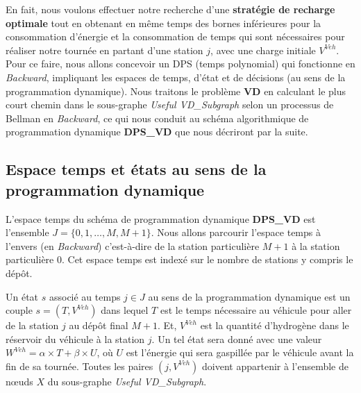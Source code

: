 En fait, nous voulons effectuer notre recherche d'une \textbf{stratégie de recharge optimale} tout en obtenant en même temps des bornes inférieures pour la consommation d'énergie et la consommation de temps qui sont nécessaires pour réaliser notre tournée en partant d'une station $j$, avec une charge initiale $V^{Veh}$. Pour ce faire, nous allons concevoir un DPS (temps polynomial) qui fonctionne en \textit{Backward}, impliquant les espaces de temps, d'état et de décisions (au sens de la programmation dynamique). Nous traitons le problème \textbf{VD} en calculant le plus court chemin dans le sous-graphe \textit{Useful VD\_Subgraph} selon un processus de Bellman en \textit{Backward}, ce qui nous conduit au schéma algorithmique de programmation dynamique \textbf{DPS\_VD} que nous décriront par la suite.
\subsection{Espace temps et états au sens de la programmation dynamique}
L'espace temps du schéma de programmation dynamique \textbf{DPS\_VD} est l'ensemble $J=\{0, 1, \dots, M, M+1\}$. Nous allons parcourir l'espace temps à l'envers (en \textit{Backward}) c'est-à-dire de la station particulière $M+1$ à la station particulière 0. Cet espace temps est indexé sur le nombre de stations y compris le dépôt.

Un état $s$ associé au temps $j\in J$ au sens de la programmation dynamique est un couple $s=(T, V^{Veh})$ dans lequel $T$ est le temps nécessaire au véhicule pour aller de la station $j$ au dépôt final $M+1$. Et, $V^{Veh}$ est la quantité d'hydrogène dans le réservoir du véhicule à la station $j$. Un tel état sera donné avec une valeur $W^{Veh} = \alpha \times T + \beta \times U$, où $U$ est l'énergie qui sera gaspillée par le véhicule avant la fin de sa tournée.
 Toutes les paires $(j, V^{Veh})$ doivent appartenir à l'ensemble de nœuds $X$ du sous-graphe \textit{Useful VD\_Subgraph}.




